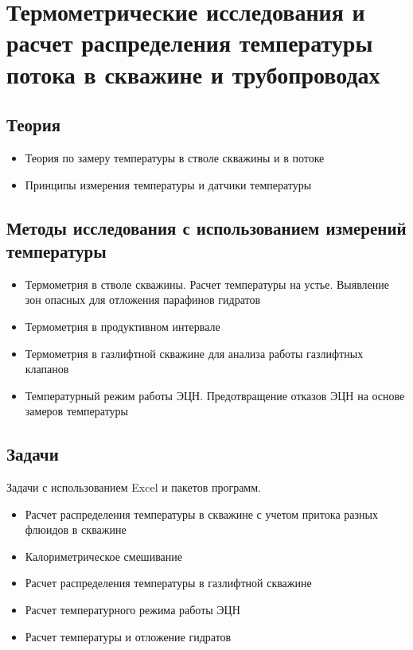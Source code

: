 \section{Термометрические исследования и расчет распределения температуры потока в скважине и трубопроводах}

\subsection{Теория}
\begin{itemize}
    \item Теория по замеру температуры в стволе скважины и в потоке
    \item Принципы измерения температуры и датчики температуры
\end{itemize}


\subsection{Методы исследования с использованием измерений температуры}

\begin{itemize}
    \item Термометрия в стволе скважины. Расчет температуры на устье. Выявление зон опасных для отложения парафинов гидратов
    
    \item Термометрия в продуктивном интервале 
    
    \item Термометрия в газлифтной скважине для анализа работы газлифтных клапанов
    
    \item Температурный режим работы ЭЦН. Предотвращение отказов ЭЦН на основе замеров температуры
\end{itemize}

\subsection{Задачи}

Задачи с использованием Excel и пакетов программ. 

\begin{itemize}
    \item Расчет распределения температуры в скважине с учетом притока разных флюидов в скважине
    \item Калориметрическое смешивание
    \item Расчет распределения температуры в газлифтной скважине
    \item Расчет температурного режима работы ЭЦН
    \item Расчет температуры и отложение гидратов
    
\end{itemize}
